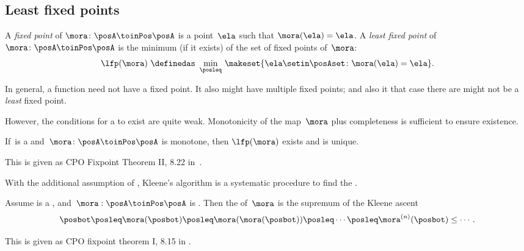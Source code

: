 \subsection{Least fixed points}

\begin{definition}
    \label{def:least-fixed}
    A \emph{fixed point} of $\mora\colon\posA\toinPos\posA$ is a point~$\ela$ such that $\mora(\ela)=\ela$.
    A \emph{least fixed point} of~$\mora\colon\posA\toinPos\posA$ is the minimum (if it exists) of the set of fixed points of~$\mora$:
    \begin{equation}
        \label{eq:lfp-one}
        \lfp(\mora)\,\,\definedas\,\,\min_{\posleq}\,\makeset{\ela \setin\posAset \colon \mora(\ela)=\ela}.
    \end{equation}
\end{definition}

In general, a function need not have a fixed point.
It also might have multiple fixed points; and also it that case there are might not be a \emph{least} fixed point.

However, the conditions for a  to exist are quite weak.
%
Monotonicity of the map~$\mora$ plus completeness is sufficient to ensure existence.

\begin{lemma}
    \label{lem:CPO-fix-point-2}
    If~\posA is a \CPO and~$\mora\colon\posA\toinPos\posA$ is monotone, then $\lfp(\mora)$ exists and is unique.
\end{lemma}
This is given as CPO Fixpoint Theorem II, 8.22 in~\cite{davey02}.

With the additional assumption of \scottcontinuity, Kleene's algorithm is a systematic procedure to find the .

\begin{lemma}
    \label{lem:kleene-1}
    Assume \posA is a \CPO, and~$\mora:\linebreak[0]\posA\toinPos\posA$ is \scottcontinuous.
    Then the  of~$\mora$ is the supremum of the Kleene ascent 
    \begin{equation}
        \label{eq:kleene-iteration}
        \posbot\posleq \mora(\posbot)\posleq \mora(\mora(\posbot))\posleq\cdots\posleq \mora^{(n)}(\posbot)\leq\cdots.
    \end{equation}
\end{lemma}
This is given as CPO fixpoint theorem I, 8.15 in \cite{davey02}.


